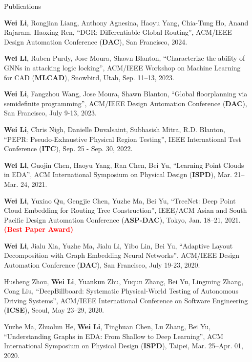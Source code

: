 \begin{rSection}{Publications}
\begin{description}[font=\normalfont]
    \item[{[C13]}]{
        \textbf{Wei Li}, Rongjian Liang, Anthony Agnesina, Haoyu Yang, Chia-Tung Ho, Anand Rajaram, Haoxing Ren, 
        ``DGR: Differentiable Global Routing'', ACM/IEEE Design Automation Conference (\textbf{DAC}), San Francisco, 2024. 
    }

\item[{[C12]}]{
    \textbf{Wei Li}, Ruben Purdy, Jose Moura, Shawn Blanton, 
    ``Characterize the ability of GNNs in attacking logic locking'', ACM/IEEE Workshop on Machine Learning for CAD (\textbf{MLCAD}), Snowbird, Utah, Sep. 11–13, 2023. 
}
    \item[{[C11]}]{
        \textbf{Wei Li},  Fangzhou Wang, Jose Moura, Shawn Blanton, 
        ``Global floorplanning via semidefinite programming'', ACM/IEEE Design Automation Conference (\textbf{DAC}), San Francisco, July 9-13, 2023.
    }
\item[{[C10]}]{
    \textbf{Wei Li}, Chris Nigh, Danielle Duvalsaint, Subhasish Mitra, R.D. Blanton, 
    ``PEPR: Pseudo-Exhaustive Physical Region Testing'', IEEE International Test Conference (\textbf{ITC}), Sep. 25 - Sep. 30, 2022.
}
\item[{[C9]}]{
    \textbf{Wei Li}, Guojin Chen, Haoyu Yang, Ran Chen, Bei Yu,
    ``Learning Point Clouds in EDA'', 
    ACM International Symposium on Physical Design (\textbf{ISPD}), Mar. 21–Mar. 24, 2021.
}
\item[{[C8]}]{
    \textbf{Wei Li}, Yuxiao Qu, Gengjie Chen, Yuzhe Ma, Bei Yu,
    ``TreeNet: Deep Point Cloud Embedding for Routing Tree Construction'', 
    IEEE/ACM Asian and South Pacific Design Automation Conference (\textbf{ASP-DAC}), Tokyo, Jan. 18–21, 2021. \textcolor{red}{\textbf{(Best Paper Award)}}
}
\item[{[C7]}]{
    \textbf{Wei Li}, Jialu Xia, Yuzhe Ma, Jialu Li, Yibo Lin, Bei Yu, 
    ``Adaptive Layout Decomposition with Graph Embedding Neural Networks'', 
    ACM/IEEE Design Automation Conference (\textbf{DAC}), San Francisco, July 19-23, 2020.
}
\item[{[C6]}]{
    Husheng Zhou, \textbf{Wei Li}, Yuankun Zhu, Yuqun Zhang, Bei Yu, Lingming Zhang, Cong Liu, 
    ``DeepBillboard: Systematic Physical-World Testing of Autonomous Driving Systems'', ACM/IEEE International Conference on Software Engineering (\textbf{ICSE}), Seoul, May 23–29, 2020.
}
\item[{[C5]}]{
    Yuzhe Ma, Zhuolun He, \textbf{Wei Li}, Tinghuan Chen, Lu Zhang, Bei Yu, 
    ``Understanding Graphs in EDA: From Shallow to Deep Learning'', ACM International Symposium on Physical Design (\textbf{ISPD}), Taipei, Mar. 25–Apr. 01, 2020.
}
\end{description}
\end{rSection}
